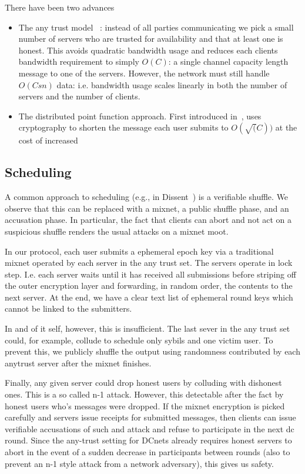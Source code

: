 There have been two advances
\begin{itemize}
	\item The any trust model ~\cite{CCS:CorFor10}: instead of all parties communicating we pick a small number of servers who are trusted for availability and that at least one is honest. This avoids quadratic bandwidth usage and reduces each clients bandwidth requirement to simply $O(C)$: a single channel capacity length message to one of the servers. However, the network must still handle $O(Csn)$ data: i.e. bandwidth usage scales linearly in both the number of servers and the number of clients.
	\item The distributed point function approach. First introduced in~\cite{SP:CorBonMaz15}, uses cryptography to shorten the message each user submits to $O(\sqrt(C))$ at the cost of increased 
\end{itemize}


\subsection{Scheduling }
A common approach to scheduling (e.g., in Dissent~\cite{CCS:CorFor10}) is a verifiable shuffle.  We observe that  this can be replaced with a mixnet, a public shuffle phase, and an accusation phase.  In particular, the fact that clients can abort and not act on a suspicious shuffle renders the usual attacks on a mixnet moot.

In our protocol, each user submits a ephemeral epoch key via a traditional mixnet operated by each server in the any trust set. The servers operate in lock step. I.e. each server waits until it has received all submissions before striping off the outer encryption layer and forwarding, in random order, the contents to the next server. At the end, we have a clear text list of ephemeral round keys which cannot be linked to the submitters.

In and of it self, however, this is insufficient.  The last sever in the any trust set could, for example,  collude to schedule only sybils and one victim user. To prevent this, we publicly shuffle the  output using randomness contributed by each anytrust server after the mixnet finishes.


Finally, any given server could drop honest users  by colluding with dishonest ones.  This is a so called n-1 attack. However, this detectable after the fact by honest users who's messages were dropped. If the mixnet encryption is picked carefully and servers issue receipts for submitted messages, then clients can issue verifiable accusations of such and attack and refuse to participate in the next dc round. Since the any-trust setting for DCnets already requires honest servers to abort in the event of a sudden decrease in participants between rounds (also to prevent an n-1 style attack from a network adversary), this gives us safety.


